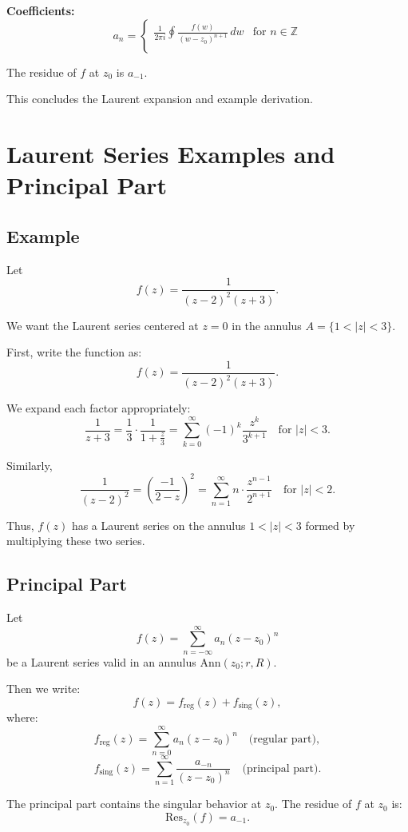 \documentclass[12pt]{article}
\theoremstyle{definition} %
\theoremstyle{plain} %
\begin{document}
\textbf{Coefficients:}
\[
a_n =
\begin{cases}
\frac{1}{2\pi i} \oint \frac{f(w)}{(w - z_0)^{n+1}}\,dw & \text{for } n \in \mathbb{Z} \\
\end{cases}
\]

The residue of $f$ at $z_0$ is $a_{-1}$.

This concludes the Laurent expansion and example derivation.
\section*{Laurent Series Examples and Principal Part}

\subsection*{Example}

Let
\[
f(z) = \frac{1}{(z - 2)^2 (z + 3)}.
\]

We want the Laurent series centered at $z = 0$ in the annulus $A = \{1 < |z| < 3\}$.

First, write the function as:
\[
f(z) = \frac{1}{(z - 2)^2 (z + 3)}.
\]

We expand each factor appropriately:
\[
\frac{1}{z + 3} = \frac{1}{3} \cdot \frac{1}{1 + \frac{z}{3}} = \sum_{k=0}^\infty (-1)^k \frac{z^k}{3^{k+1}} \quad \text{for } |z| < 3.
\]

Similarly,
\[
\frac{1}{(z - 2)^2} = \left( \frac{-1}{2 - z} \right)^2 = \sum_{n=1}^\infty n \cdot \frac{z^{n-1}}{2^{n+1}} \quad \text{for } |z| < 2.
\]

Thus, $f(z)$ has a Laurent series on the annulus $1 < |z| < 3$ formed by multiplying these two series.

\subsection*{Principal Part}

Let
\[
f(z) = \sum_{n = -\infty}^\infty a_n (z - z_0)^n
\]
be a Laurent series valid in an annulus $\text{Ann}(z_0; r, R)$.

Then we write:
\[
f(z) = f_{\text{reg}}(z) + f_{\text{sing}}(z),
\]
where:
\[
f_{\text{reg}}(z) = \sum_{n=0}^\infty a_n (z - z_0)^n
\quad \text{(regular part)},
\]
\[
f_{\text{sing}}(z) = \sum_{n=1}^\infty \frac{a_{-n}}{(z - z_0)^n}
\quad \text{(principal part)}.
\]

The principal part contains the singular behavior at $z_0$. The residue of $f$ at $z_0$ is:
\[
\text{Res}_{z_0}(f) = a_{-1}.
\]
\end{document}
